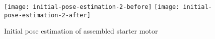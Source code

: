 \begin{figure}[!ht]
	\centering
	\texttt{[image: initial-pose-estimation-2-before]}
	\hspace{0.5em}
	\texttt{[image: initial-pose-estimation-2-after]}
	\caption{Initial pose estimation of assembled starter motor}
	\label{fig:initial-pose-estimation}
\end{figure}
